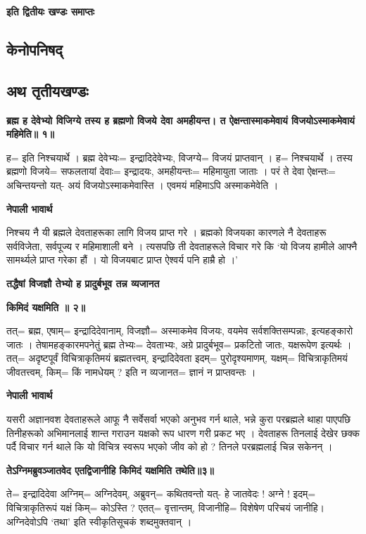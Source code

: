\documentclass[11pt, a5paper]{article}
\begin{document}
\textbf{इति द्वितीयः खण्डः समाप्तः}

\subsection{\textbf{केनोपनिषद्}}

\subsection{\textbf{अथ तृतीयखण्डः}}

\textbf{ब्रह्म ह देवेभ्यो विजिग्ये तस्य ह ब्रह्मणो विजये देवा अमहीयन्त। त ऐक्षन्तास्माकमेवायं विजयोऽस्माकमेवायं महिमेति॥ १॥}

ह= इति निश्चयार्थे । ब्रह्म देवेभ्यः= इन्द्रादिदेवेभ्यः, विजग्ये= विजयं प्राप्तवान् । ह= निश्चयार्थे । तस्य ब्रह्मणो विजये= सफलतायां देवाः‍= इन्द्रादयः, अमहीयन्तः= महिमायुता जाताः । परं ते देवा ऐक्षन्तः= अचिन्तयन्तो यत्- अयं विजयोऽस्माकमेवास्ति । एवमयं महिमाऽपि अस्माकमेवेति ।

\textbf{नेपाली भावार्थ}

निश्चय नै यी ब्रह्मले देवताहरूका लागि विजय प्राप्त गरे । ब्रह्मको विजयका कारणले नै देवताहरू सर्वविजेता, सर्वपूज्य र महिमाशाली बने । त्यसपछि ती देवताहरूले विचार गरे कि ‘यो विजय हामीले आफ्नै सामर्थ्यले प्राप्त गरेका हौं । यो विजयबाट प्राप्त ऐश्वर्य पनि हाम्रै हो ।’

\textbf{तद्धैषां विजज्ञौ तेभ्यो ह प्रादुर्बभूव तन्न व्यजानत}

\textbf{किमिदं यक्षमिति ॥ २॥}

तत्= ब्रह्म, एषाम्= इन्द्रादिदेवानाम्, विजज्ञौ= अस्माकमेव विजयः, वयमेव सर्वशक्तिसम्पन्नाः, इत्यहङ्कारो जातः । तेषामहङ्कारमपनेतुं ब्रह्म तेभ्यः= देवताभ्यः, अग्रे प्रादुर्बभूव‍= प्रकटितो जातः, यक्षरूपेण इत्यर्थः । तत्= अदृष्टपूर्वं विचित्राकृतिमयं ब्रह्मतत्त्वम्, इन्द्रादिदेवता इदम्= पुरोदृश्यमाणम्, यक्षम्= विचित्राकृतिमयं जीवतत्त्वम्, किम्= किं नामधेयम् ? इति न व्यजानत= ज्ञानं न प्राप्तवन्तः ।

\textbf{नेपाली भावार्थ}

यसरी अज्ञानवश देवताहरूले आफू नै सर्वेसर्वा भएको अनुभव गर्न थाले, भन्ने कुरा परब्रह्मले थाहा पाएपछि तिनीहरूको अभिमानलाई शान्त गराउन यक्षको रूप धारण गरी प्रकट भए । देवताहरू तिनलाई देखेर छक्क पर्दै विचार गर्न थाले कि यो विचित्र स्वरूप भएको जीव को हो ? तिनले परब्रह्मलाई चिन्न सकेनन् ।

\textbf{तेेऽग्निमब्रुवञ्जातवेद एतद्विजानीहि किमिदं यक्षमिति तथेति॥३॥}

ते= इन्द्रादिदेवा अग्निम्= अग्निदेवम्, अब्रुवन्= कथितवन्तो यत्- हे जातवेदः ! अग्ने !  इदम्= विचित्राकृतिरूपं यक्षं किम्= कोऽस्ति ? एतत्= वृत्तान्तम्, विजानीहि= विशेषेण परिचयं जानीहि। अग्निदेवोऽपि ‘तथा’ इति स्वीकृतिसूचकं शब्दमुक्तवान् ।
\end{document}
